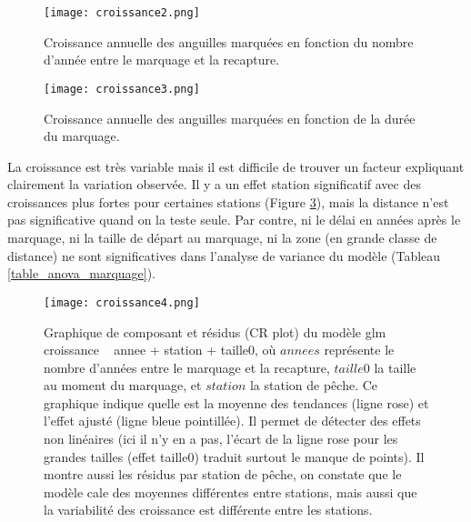 \documentclass[10pt,twocolumn,titlepage,twoside]{article}\usepackage[]{graphicx}\usepackage[]{color}
\begin{document}
\begin{figure}[htbp]
\centering
\texttt{[image: croissance2.png]}
\caption[Croissance annuelles des anguilles marquées]{Croissance annuelle des
anguilles marquées en fonction du nombre d'année entre le marquage et la
recapture.}
\label{croissance2}
\end{figure}


\begin{figure}[htbp]
\centering
\texttt{[image: croissance3.png]}
\caption[Croissance annuelles des anguilles marquées]{Croissance annuelle des
anguilles marquées en fonction de la durée du marquage.}
\label{croissance3}
\end{figure}


La croissance est très variable mais il est difficile de trouver un facteur
expliquant clairement la variation observée. Il y a un effet station significatif avec des croissances plus fortes
pour certaines stations (Figure \ref{croissance4}), mais la distance n'est pas significative
quand on la teste seule. Par contre, ni le délai en années après le
marquage, ni la taille de départ au marquage, ni la zone (en grande
classe de distance) ne sont significatives dans l'analyse de variance du
modèle (Tableau \ref{table_anova_marquage}). 



\begin{figure}[htbp]
\centering
\texttt{[image: croissance4.png]}
\caption[Graphique de composant et résidus du modèle glm croissance ~ annee +
station + taille initiale.]{Graphique de composant et résidus (CR plot) du
modèle glm croissance ~ annee + station + taille0, où $annees$ représente le
nombre d'années entre le marquage et la recapture, $taille0$ la taille au moment
du marquage, et $station$ la station de pêche. Ce graphique indique quelle est la
moyenne des tendances (ligne rose) et l'effet ajusté (ligne bleue
pointillée).
Il permet de détecter des effets non linéaires (ici il n'y en a pas, l'écart de
la ligne rose pour les grandes tailles
(effet taille0) traduit surtout le manque de points). Il montre aussi les
résidus par station de pêche, on constate que le modèle cale des moyennes différentes entre
stations, mais aussi que la variabilité des croissance est différente entre les
stations.}
\label{croissance4}
\end{figure}


\end{document}
